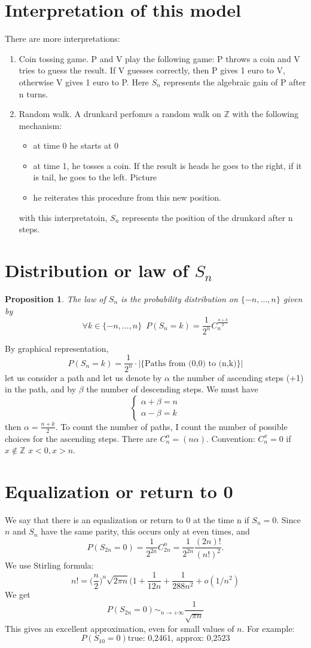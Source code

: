\documentclass[10pt,a4paper]{book}
\newtheorem{proposition}[theorem]{Proposition}
\theoremstyle{definition}
\begin{document}
\section{Interpretation of this model}
There are more interpretations:
\begin{enumerate}
\item Coin tossing game. P and V play the following game: P throws a coin and V tries to guess the result. If V guesses correctly, then P gives 1 euro to V, otherwise V gives 1 euro to P.
Here $S_n$ represents the algebraic gain of P after n turns.
\item Random walk. A drunkard perfomrs a random walk on $\mathbb{Z}$ with the following mechanism:
\begin{itemize}
\item at time 0 he starts at 0
\item at time 1, he tosses a coin. If the result is heads he goes to the right, if it is tail, he goes to the left. Picture
\item he reiterates this procedure from this new position.
\end{itemize}
with this interpretatoin, $S_n$ represents the position of the drunkard after n steps.
\end{enumerate}

%
\section{Distribution or law of $S_n$}
\begin{proposition}
The law of $S_n$ is the probability distribution on $\{-n,\ldots,n\}$ given by 
$$\forall k\in \{-n,\ldots,n\}\,\,\,P(S_n=k)=\frac{1}{2^n}C_n^{\frac{n+k}{2}}$$
\end{proposition}
\proof
By graphical representation, 
$$P(S_n=k)=\frac{1}{2^n}\cdot |\{\text{Paths from (0,0) to (n,k)}\}|$$
let us consider a path and let us denote by $\alpha$ the number of ascending steps (+1) in the path, and by $\beta$ the number of descending steps. We must have
$$\begin{cases}
\alpha+\beta=n\\
\alpha-\beta=k
\end{cases}
$$
then $\alpha=\frac{n+k}{2}$. To count the number of paths, I count the number of possible choices for the ascending steps. There are $C_n^{\alpha}=(n \alpha)$. Convention: $C_n^x=0$ if $x\notin \mathbb{Z}$
$x<0,x>n$.


\section{Equalization or return to 0}
We say that there is an equalization or return to 0 at the time n if $S_n=0$. Since $n$ and $S_n$ have the same parity, this occurs only at even times, and 
$$P(S_{2n}=0)=\frac{1}{2^{2n}}C_{2n}^n=\frac{1}{2^{2n}}\frac{(2n)!}{(n!)^2}.$$ We use Stirling formula:
$$n!=(\frac{n}{2}\bigg)^n\sqrt{2\pi n}\bigg(1+\frac{1}{12n}+\frac{1}{288n^2}+o(1/n^2)$$
We get 
$$P(S_{2n}=0)\sim_{n\to +\infty}\frac{1}{\sqrt{\pi n}}$$ 
This gives an excellent approximation, even for small values of $n$. For example:
$$P(S_{10}=0)\text{true: 0,2461, approx: 0,2523}$$
\end{document}
